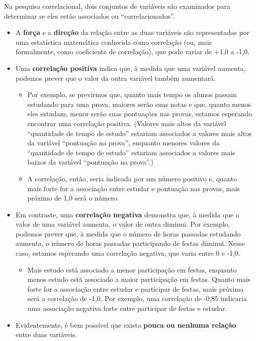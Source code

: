 \documentclass[
]{book}
\providecommand{\tightlist}{%
  \setlength{\itemsep}{0pt}\setlength{\parskip}{0pt}}
\begin{document}
Na pesquisa correlacional, dois conjuntos de variáveis são examinados
para determinar se eles estão associados ou ``correlacionados''.

\begin{itemize}
\tightlist
\item
  A \textbf{força} e a \textbf{direção} da relação entre as duas variáveis são
  representadas por uma estatística matemática conhecida como
  correlação (ou, mais formalmente, como
  coeficiente de correlação), que pode variar de
  +1,0 a -1,0.
\item
  Uma \textbf{correlação positiva} indica que, à medida que uma variável
  aumenta, podemos prever que o valor da outra variável também
  aumentará.

  \begin{itemize}
  \tightlist
  \item
    Por exemplo, se previrmos que, quanto mais tempo os alunos
    passam estudando para uma prova, maiores serão suas notas e que,
    quanto menos eles estudam, menor serão suas pontuações nas
    provas, estamos esperando encontrar uma correlação positiva.
    (Valores mais altos da variável ``quantidade de tempo de estudo''
    estariam associados a valores mais altos da variável ``pontuação
    na prova'', enquanto menores valores da ``quantidade de tempo de
    estudo'' estariam associados a valores mais baixos da variável
    ``pontuação na prova''.)
  \item
    A correlação, então, seria indicada por um número positivo e,
    quanto mais forte for a associação entre estudar e pontuação nas
    provas, mais próximo de 1,0 será o número.
  \end{itemize}
\item
  Em contraste, uma \textbf{correlação negativa} demonstra que, à medida
  que o valor de uma variável aumenta, o valor de outra diminui. Por
  exemplo, podemos prever que, à medida que o número de horas passadas
  estudando aumenta, o número de horas passadas participando de festas
  diminui. Nesse caso, estamos esperando uma correlação negativa, que
  varia entre 0 e -1,0.

  \begin{itemize}
  \tightlist
  \item
    Mais estudo está associado a menor participação em festas,
    enquanto menos estudo está associado a maior participação em
    festas. Quanto mais forte for a associação entre estudar e
    participar de festas, mais próxima será a correlação de -1,0.
    Por exemplo, uma correlação de -0,85 indicaria uma associação
    negativa forte entre participar de festas e estudar.
  \end{itemize}
\item
  Evidentemente, é bem possível que exista \textbf{pouca ou nenhuma
  relação} entre duas variáveis.


\end{itemize}
\end{document}
